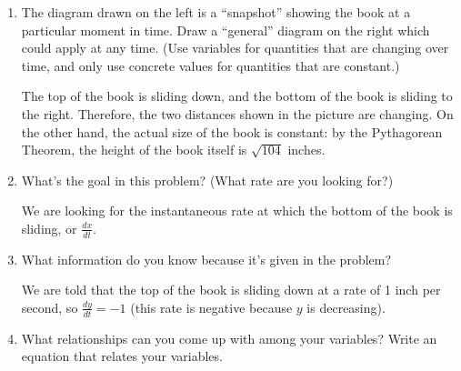 \documentclass[main]{subfiles}
\begin{document}
\begin{enumerate}
      \begin{enumerate}
      \item
        \begin{problem}
        The diagram drawn on the left is a ``snapshot'' showing the book at a particular moment in time.  Draw a ``general'' diagram on the right which could apply at any time. (Use variables for quantities that are changing over time, and only use concrete values for quantities that are constant.)
        \end{problem}

    \begin{solution}
        The top of the book is sliding down, and the bottom of the book is
        sliding to the right.  Therefore, the two distances shown in the
        picture are changing.  On the other hand, the actual size of the
        book is constant: by the Pythagorean Theorem, the height of the
        book itself is $\sqrt{104}$ inches. 
      \end{solution}

    \item
      \begin{problem}[\stretch{0.5}]
        What's the goal in this problem?  (What rate are you looking for?)
      \end{problem}

      \begin{solution}
        We are looking for the instantaneous rate at which the bottom of
        the book is sliding, or $\frac{dx}{dt}$. 
      \end{solution}

    \item
      \begin{problem}[\stretch{0.5}]
        What information do you know because it's given in the problem?
      \end{problem}

      \begin{solution}
        We are told that the top of the book is sliding down at a rate of
        1 inch per second, so $\frac{dy}{dt} = -1$ (this rate is negative
        because $y$ is decreasing). 
      \end{solution}

    \item
      \begin{problem}[\stretch{0.5}]
        What relationships can you come up with among your variables?
        Write an equation that relates your variables.
      \end{problem}


\end{enumerate}
\end{enumerate}
\end{document}
